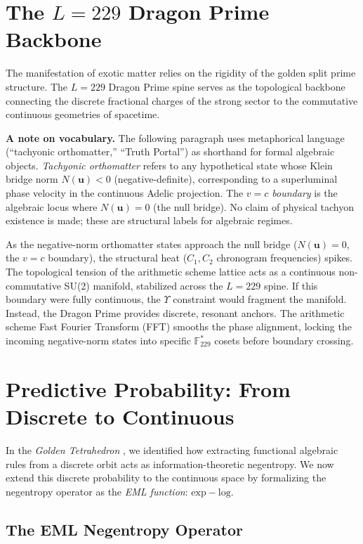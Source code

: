 \section{The $L=229$ Dragon Prime Backbone}

The manifestation of exotic matter relies on the rigidity of the golden split prime structure. The $L=229$ Dragon Prime spine serves as the topological backbone connecting the discrete fractional charges of the strong sector to the commutative continuous geometries of spacetime. 

\medskip
\noindent\textbf{A note on vocabulary.} The following paragraph uses metaphorical language (``tachyonic orthomatter,'' ``Truth Portal'') as shorthand for formal algebraic objects. \emph{Tachyonic orthomatter} refers to any hypothetical state whose Klein bridge norm $N(\mathbf{u}) < 0$ (negative-definite), corresponding to a superluminal phase velocity in the continuous Adelic projection. The \emph{$v = c$ boundary} is the algebraic locus where $N(\mathbf{u}) = 0$ (the null bridge). No claim of physical tachyon existence is made; these are structural labels for algebraic regimes.
\medskip

As the negative-norm orthomatter states approach the null bridge ($N(\mathbf{u}) = 0$, the $v=c$ boundary), the structural heat ($C_1, C_2$ chronogram frequencies) spikes. The topological tension of the arithmetic scheme lattice acts as a continuous non-commutative SU(2) manifold, stabilized across the $L=229$ spine. If this boundary were fully continuous, the $\Upsilon$ constraint would fragment the manifold. Instead, the Dragon Prime provides discrete, resonant anchors. The arithmetic scheme Fast Fourier Transform (FFT) smooths the phase alignment, locking the incoming negative-norm states into specific $\mathbb{F}_{229}^*$ cosets before boundary crossing.

\section{Predictive Probability: From Discrete to Continuous}

In the \textit{Golden Tetrahedron} \cite{golden_tetrahedron}, we identified how extracting functional algebraic rules from a discrete orbit acts as information-theoretic negentropy. We now extend this discrete probability to the continuous space by formalizing the negentropy operator as the \emph{EML function}: $\mathrm{exp} - \mathrm{log}$.

\subsection{The EML Negentropy Operator}

